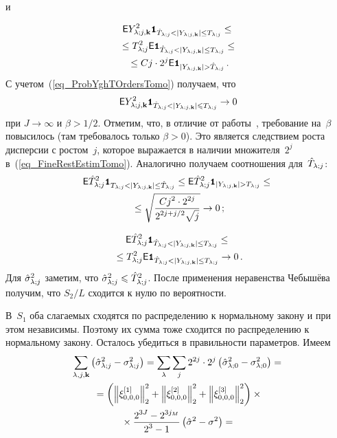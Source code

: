\begin{multicols}{2}

\noindent
и

\noindent
\begin{multline}
\e \Yljk^2 \Ik_{\hTlj<|\Yljk|\leq\Tlj} \leq {}\\
{}\leq \Tlj^2 \e \Ik_{\hTlj<|\Yljk|\leq 
 \Tlj} \leq{}\\
{}\leq C j\cdot 2^{j}
\e \indYjkghTj\,.
\label{eq_FineRestEstimTomo}
\end{multline}
С учетом~(\ref{eq_ProbYghTOrdersTomo}) получаем, что
\begin{equation*}
\e \Yljk^2 \Ik_{\hTlj<|\Yljk|\leqslant\Tlj} \rightarrow 0
\end{equation*}
при $J\rightarrow\infty$ и $\beta>1/2$. Отметим, что, в отличие от работы~\cite{MarkinLimitDistr}, 
требование на~$\beta$ повысилось (там требовалось только $\beta>0$). Это является следствием роста дисперсии с 
ростом~$j$, которое выражается в наличии множителя~$2^j$ в~(\ref{eq_FineRestEstimTomo}). 
Аналогично получаем соотношения для~$\hat T_{\lambda;j}$:
\begin{multline*}
\e \hTlj^2 \Ik_{\Tlj<|\Yljk|\leq\hTlj} \leq \e \hTlj^2 \indYjkgTj \leq{}\\
{}\leq \sqrt{ \fr{ C j^2 \cdot 2^{2j} }{ 2^{2j+j/2}\sqrt{j} } } \rightarrow 0\,;
\end{multline*}

\vspace*{-12pt}

\noindent
\begin{multline*}
\e \hTlj^2 \Ik_{\hTlj<|\Yljk|\leq\Tlj} \leq{}\\
{}\leq \Tlj^2 \e\Ik_{\hTlj<|\Yljk|\leq\Tlj} \rightarrow 0\,.
\end{multline*}
Для $\hat\sigma^2_{\lambda;j}$ заметим, что $\hat\sigma^2_{\lambda;j}\leqslant\hat T_{\lambda;j}^2$. После применения неравенства Чебышёва получим, что 
$S_2/L$ сходится к нулю по вероятности.

В~$S_1$ оба слагаемых сходятся по распределению к нормальному закону и при этом независимы. 
Поэтому их сумма тоже сходится по распределению к нормальному закону. Осталось убедиться в 
правильности параметров. Имеем
\begin{multline*}
\sum\limits_{\lambda,j,\mathbf{k}} \left(\hat\sigma^2_{\lambda;j}-\sigma_{\lambda;j}^2\right) = \sum\limits_\lambda \sum_j 2^{2j}\cdot 2^j \left(\hat\sigma_{\lambda;0}^2-\sigma_{\lambda;0}^2\right) = {}\\
{}= \left( \left\|\xi^{[1]}_{0,0,0}\right\|_2^2 + \left\|\xi^{[2]}_{0,0,0}\right\|_2^2 + 
\left\|\xi^{[3]}_{0,0,0}\right\|_2^2 \right)\times{}\\
{}\times \displaystyle\frac{\displaystyle 2^{3J}-2^{3j_M}\mathstrut}{\displaystyle 2^3-1\mathstrut} \left(\hat\sigma^2-\sigma^2\right) = {}
\end{multline*}


\end{multicols}

